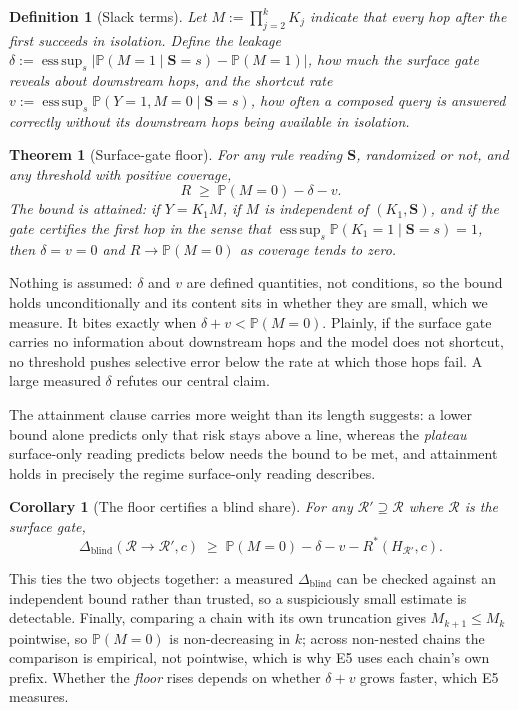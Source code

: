 \documentclass{article}
\newtheorem{theorem}{Theorem}
\newtheorem{corollary}{Corollary}
\newtheorem{definition}{Definition}
\newcommand{\esssup}{\operatorname*{ess\,sup}}
\newcommand{\gate}{\mathbf{S}}
\begin{document}
\begin{definition}[Slack terms]
\label{def:slack}
Let $M:=\prod_{j=2}^{k}K_j$ indicate that every hop after the first succeeds in isolation. Define the
\emph{leakage} $\delta:=\esssup_s|\mathbb{P}(M=1\mid\gate=s)-\mathbb{P}(M=1)|$, how much the surface
gate reveals about downstream hops, and the \emph{shortcut rate}
$v:=\esssup_s\mathbb{P}(Y=1,M=0\mid\gate=s)$, how often a composed query is answered correctly
without its downstream hops being available in isolation.
\end{definition}

\begin{theorem}[Surface-gate floor]
\label{thm:floor}
For any rule reading $\gate$, randomized or not, and any threshold with positive coverage,
\[
R\;\ge\;\mathbb{P}(M=0)-\delta-v .
\]
The bound is attained: if $Y=K_1M$, if $M$ is independent of $(K_1,\gate)$, and if the gate certifies
the first hop in the sense that $\esssup_s\mathbb{P}(K_1=1\mid\gate=s)=1$, then $\delta=v=0$ and
$R\to\mathbb{P}(M=0)$ as coverage tends to zero.
\end{theorem}

Nothing is assumed: $\delta$ and $v$ are defined quantities, not conditions, so the bound holds
unconditionally and its content sits in whether they are small, which we measure. It bites exactly
when $\delta+v<\mathbb{P}(M=0)$. Plainly, if the surface gate carries no information about downstream
hops and the model does not shortcut, no threshold pushes selective error below the rate at which
those hops fail. A large measured $\delta$ refutes our central claim.

The attainment clause carries more weight than its length suggests: a lower bound alone predicts only
that risk stays above a line, whereas the \emph{plateau} surface-only reading predicts below needs the
bound to be met, and attainment holds in precisely the regime surface-only reading describes.

\begin{corollary}[The floor certifies a blind share]
\label{cor:link}
For any $\mathcal{R}'\supseteq\mathcal{R}$ where $\mathcal{R}$ is the surface gate,
\[
\Delta_{\mathrm{blind}}(\mathcal{R}\to\mathcal{R}',c)\;\ge\;\mathbb{P}(M=0)-\delta-v-R^\ast(H_{\mathcal{R}'},c).
\]
\end{corollary}

This ties the two objects together: a measured $\Delta_{\mathrm{blind}}$ can be checked against an
independent bound rather than trusted, so a suspiciously small estimate is detectable. Finally, comparing a chain with its own truncation gives $M_{k+1}\le M_k$ pointwise, so
$\mathbb{P}(M=0)$ is non-decreasing in $k$; across non-nested chains the comparison is empirical, not
pointwise, which is why E5 uses each chain's own prefix. Whether the \emph{floor} rises depends on
whether $\delta+v$ grows faster, which E5 measures.
\end{document}
